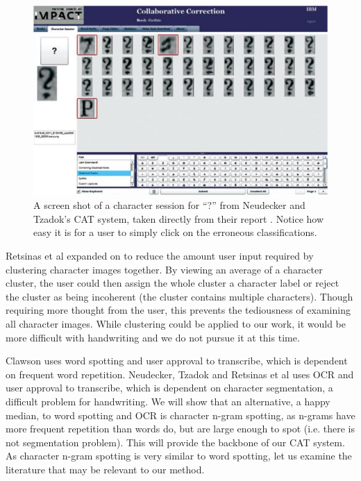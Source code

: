 \documentclass[ms]{byuprop}
\begin{document}
\begin{figure}
    \centering
    \includegraphics[width=.9\textwidth]{carpet}
    \caption{A screen shot of a character session for ``?'' from Neudecker and Tzadok's CAT system, taken directly from their report \cite{Neudecker2010}. Notice how easy it is for a user to simply click on the erroneous classifications.}
    \label{fig:carpet}
\end{figure}

Retsinas et al\cite{Retsinas2015} expanded on \cite{Neudecker2010} to reduce the amount user input required by clustering character images together. By viewing an average of a character cluster, the user could then assign the whole cluster a character label or reject the cluster as being incoherent (the cluster contains multiple characters). Though requiring more thought from the user, this prevents the tediousness of examining all character images. While clustering could be applied to our work, it would be more difficult with handwriting and we do not pursue it at this time.



Clawson\cite{Clawson2014} uses word spotting and user approval to transcribe, which is dependent on frequent word repetition. Neudecker, Tzadok\cite{Neudecker2010} and Retsinas et al\cite{Retsinas2015} uses OCR and user approval to transcribe, which is dependent on character segmentation, a difficult problem for handwriting.
 We will show that an alternative, a happy median, to word spotting and OCR is character n-gram spotting, as n-grams have more frequent repetition than words do, but are large enough to spot (i.e. there is not segmentation problem). This will provide the backbone of our CAT system. As character n-gram spotting is very similar to word spotting, let us examine the literature that may be relevant to our method.
\end{document}

